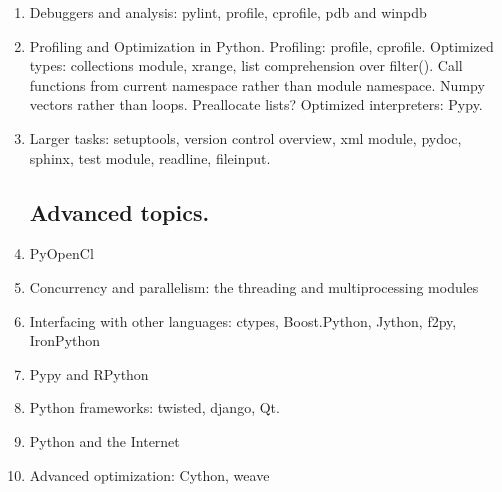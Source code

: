 \begin{enumerate}
    \item Debuggers and analysis: pylint, profile, cprofile, pdb and winpdb

    \item Profiling and Optimization in Python. Profiling: profile, cprofile. Optimized types: collections module, xrange, list comprehension over filter(). Call functions from current namespace rather than module namespace. Numpy vectors rather than loops. Preallocate lists? Optimized interpreters: Pypy.

    \item Larger tasks: setuptools, version control overview, xml module, pydoc, sphinx, test module, readline, fileinput.

\subsection{Advanced topics.}
    \item PyOpenCl

    \item Concurrency and parallelism: the threading and multiprocessing modules

    \item Interfacing with other languages: ctypes, Boost.Python, Jython, f2py, IronPython

    \item Pypy and RPython

    \item Python frameworks: twisted, django, Qt.

    \item Python and the Internet

    \item Advanced optimization: Cython, weave

\end{enumerate}